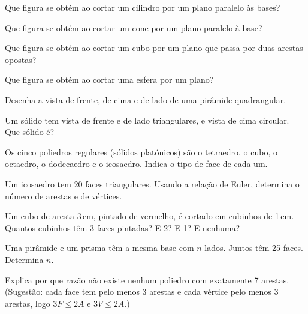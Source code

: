 \documentclass[12pt]{article}
\begin{document}
\begin{exercicios}
  \item Que figura se obtém ao cortar um cilindro por um plano paralelo às bases?
  \item Que figura se obtém ao cortar um cone por um plano paralelo à base?
  \item Que figura se obtém ao cortar um cubo por um plano que passa por duas arestas opostas?
  \item Que figura se obtém ao cortar uma esfera por um plano?
  \item Desenha a vista de frente, de cima e de lado de uma pirâmide quadrangular.
  \item Um sólido tem vista de frente e de lado triangulares, e vista de cima circular. Que sólido é?
\end{exercicios}

\begin{exercicios}
  \item Os cinco poliedros regulares (sólidos platónicos) são o tetraedro, o cubo, o octaedro, o dodecaedro e o icosaedro. Indica o tipo de face de cada um.
  \item Um icosaedro tem 20 faces triangulares. Usando a relação de Euler, determina o número de arestas e de vértices.
  \item Um cubo de aresta 3\,cm, pintado de vermelho, é cortado em cubinhos de 1\,cm. Quantos cubinhos têm 3 faces pintadas? E 2? E 1? E nenhuma?
  \item Uma pirâmide e um prisma têm a mesma base com $n$ lados. Juntos têm 25 faces. Determina $n$.
  \item Explica por que razão não existe nenhum poliedro com exatamente 7 arestas. (Sugestão: cada face tem pelo menos 3 arestas e cada vértice pelo menos 3 arestas, logo $3F \le 2A$ e $3V \le 2A$.)
\end{exercicios}
\end{document}
